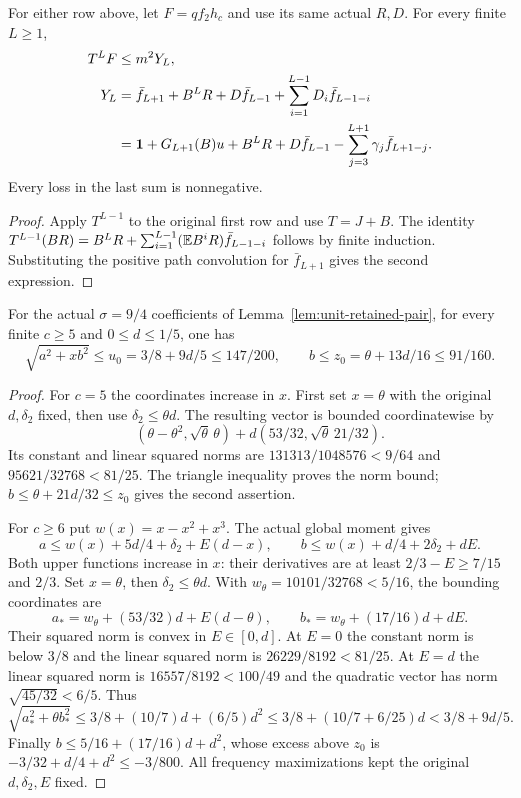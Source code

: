 \begin{lemma}
\label{lem:reference-retained:continuation}
For either row above, let $F=qf_2h_c$ and use its same actual $R,D$.
For every finite $L\ge1$,
\begin{equation}\label{eq:reference-retained:continuation}
\begin{aligned}
 T^LF&\le m^2Y_L,\\
 Y_L&=\bar f_{L+1}+B^LR+D\bar f_{L-1}
             +\sum_{i=1}^{L-1}D_i\bar f_{L-1-i}\\
 &=\mathbf1+G_{L+1}(B)u+B^LR+D\bar f_{L-1}
             -\sum_{j=3}^{L+1}\gamma_j\bar f_{L+1-j}.
\end{aligned}
\end{equation}
Every loss in the last sum is nonnegative.
\end{lemma}
\begin{proof}
Apply $T^{L-1}$ to the original first row and use $T=J+B$.
The identity
$T^{L-1}(BR)=B^LR+\sum_{i=1}^{L-1}(\mathbb E B^iR)\bar f_{L-1-i}$
follows by finite induction. Substituting the positive path convolution
for $\bar f_{L+1}$ gives the second expression.
\end{proof}

\begin{lemma}
\label{lem:reference-retained:strong-norm}
For the actual $\sigma=9/4$ coefficients of
Lemma~\ref{lem:unit-retained-pair}, for every finite $c\ge5$ and
$0\le d\le1/5$, one has
\begin{equation}\label{eq:reference-retained:strong-norm}
 \sqrt{a^2+xb^2}\le u_0=3/8+9d/5\le147/200,
 \qquad b\le z_0=\theta+13d/16\le91/160.
\end{equation}
\end{lemma}
\begin{proof}
For $c=5$ the coordinates increase in $x$. First set $x=\theta$
with the original $d,\delta_2$ fixed, then use $\delta_2\le\theta d$.
The resulting vector is bounded coordinatewise by
\[
 (\theta-\theta^2,\sqrt\theta\,\theta)
   +d(53/32,\sqrt\theta\,21/32).
\]
Its constant and linear squared norms are
$131313/1048576<9/64$ and $95621/32768<81/25$.
The triangle inequality proves the norm bound;
$b\le\theta+21d/32\le z_0$ gives the second assertion.

For $c\ge6$ put $w(x)=x-x^2+x^3$. The actual global moment gives
\[
 a\le w(x)+5d/4+\delta_2+E(d-x),\qquad
 b\le w(x)+d/4+2\delta_2+dE.
\]
Both upper functions increase in $x$: their derivatives are at least
$2/3-E\ge7/15$ and $2/3$. Set $x=\theta$, then
$\delta_2\le\theta d$. With $w_\theta=10101/32768<5/16$,
the bounding coordinates are
\[
 a_*=w_\theta+(53/32)d+E(d-\theta),\qquad
 b_*=w_\theta+(17/16)d+dE.
\]
Their squared norm is convex in $E\in[0,d]$.
At $E=0$ the constant norm is below $3/8$ and the linear
squared norm is $26229/8192<81/25$.
At $E=d$ the linear squared norm is $16557/8192<100/49$ and
the quadratic vector has norm $\sqrt{45/32}<6/5$. Thus
\[
 \sqrt{a_*^2+\theta b_*^2}
 \le3/8+(10/7)d+(6/5)d^2
 \le3/8+(10/7+6/25)d<3/8+9d/5.
\]
Finally $b\le5/16+(17/16)d+d^2$, whose excess above $z_0$ is
$-3/32+d/4+d^2\le-3/800$. All frequency maximizations kept the
original $d,\delta_2,E$ fixed.
\end{proof}

